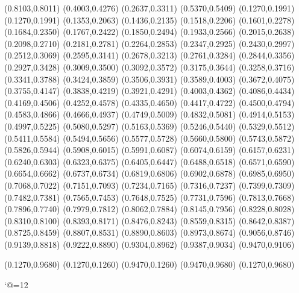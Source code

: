 \PST@Diamond(0.8103,0.8011)
\PST@Diamond(0.4003,0.4276)
\PST@Diamond(0.2637,0.3311)
\PST@Diamond(0.5370,0.5409)
\PST@Dashed(0.1270,0.1991)
(0.1270,0.1991)
(0.1353,0.2063)
(0.1436,0.2135)
(0.1518,0.2206)
(0.1601,0.2278)
(0.1684,0.2350)
(0.1767,0.2422)
(0.1850,0.2494)
(0.1933,0.2566)
(0.2015,0.2638)
(0.2098,0.2710)
(0.2181,0.2781)
(0.2264,0.2853)
(0.2347,0.2925)
(0.2430,0.2997)
(0.2512,0.3069)
(0.2595,0.3141)
(0.2678,0.3213)
(0.2761,0.3284)
(0.2844,0.3356)
(0.2927,0.3428)
(0.3009,0.3500)
(0.3092,0.3572)
(0.3175,0.3644)
(0.3258,0.3716)
(0.3341,0.3788)
(0.3424,0.3859)
(0.3506,0.3931)
(0.3589,0.4003)
(0.3672,0.4075)
(0.3755,0.4147)
(0.3838,0.4219)
(0.3921,0.4291)
(0.4003,0.4362)
(0.4086,0.4434)
(0.4169,0.4506)
(0.4252,0.4578)
(0.4335,0.4650)
(0.4417,0.4722)
(0.4500,0.4794)
(0.4583,0.4866)
(0.4666,0.4937)
(0.4749,0.5009)
(0.4832,0.5081)
(0.4914,0.5153)
(0.4997,0.5225)
(0.5080,0.5297)
(0.5163,0.5369)
(0.5246,0.5440)
(0.5329,0.5512)
(0.5411,0.5584)
(0.5494,0.5656)
(0.5577,0.5728)
(0.5660,0.5800)
(0.5743,0.5872)
(0.5826,0.5944)
(0.5908,0.6015)
(0.5991,0.6087)
(0.6074,0.6159)
(0.6157,0.6231)
(0.6240,0.6303)
(0.6323,0.6375)
(0.6405,0.6447)
(0.6488,0.6518)
(0.6571,0.6590)
(0.6654,0.6662)
(0.6737,0.6734)
(0.6819,0.6806)
(0.6902,0.6878)
(0.6985,0.6950)
(0.7068,0.7022)
(0.7151,0.7093)
(0.7234,0.7165)
(0.7316,0.7237)
(0.7399,0.7309)
(0.7482,0.7381)
(0.7565,0.7453)
(0.7648,0.7525)
(0.7731,0.7596)
(0.7813,0.7668)
(0.7896,0.7740)
(0.7979,0.7812)
(0.8062,0.7884)
(0.8145,0.7956)
(0.8228,0.8028)
(0.8310,0.8100)
(0.8393,0.8171)
(0.8476,0.8243)
(0.8559,0.8315)
(0.8642,0.8387)
(0.8725,0.8459)
(0.8807,0.8531)
(0.8890,0.8603)
(0.8973,0.8674)
(0.9056,0.8746)
(0.9139,0.8818)
(0.9222,0.8890)
(0.9304,0.8962)
(0.9387,0.9034)
(0.9470,0.9106)

\PST@Border(0.1270,0.9680)
(0.1270,0.1260)
(0.9470,0.1260)
(0.9470,0.9680)
(0.1270,0.9680)

\catcode`@=12
\fi
\endpspicture

